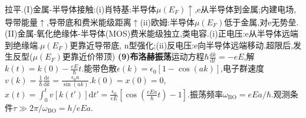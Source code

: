 \documentclass[UTF8,a4paper,10pt,twocolumn]{ctexart}
\begin{document}
拉平.(I)金属-半导体接触:(i)肖特基:半导体$\mu(E_{F})\uparrow$,e从半导体到金属;内建电场,导带能量$\uparrow$,导带底和费米能级距离$\uparrow$(ii)欧姆:半导体$\mu(E_{F})$低于金属,对e无势垒.(II)金属-氧化绝缘体-半导体(MOS)费米能级独立,类电容.(i)正电压:e从半导体远端到绝缘端.$\mu(E_{F})$更靠近导带底, n型强化;(ii)反电压:e向半导体远端移动.超限后,发生反型($\mu(E_{F})$更靠近价带顶)
   \textbf{(9)布洛赫振荡}运动方程$\hbar\frac{\mathrm{d}k}{\mathrm{d}t}=-eE$,解$k(t)=k(0)-\frac{eE}{\hbar}t$.能带色散$\epsilon(k)=\epsilon_{0}[1-\cos{(ak)}]$,电子群速度$v(k)=\frac{1}{\hbar}\frac{\mathrm{d}\epsilon}{\mathrm{d}k}=\frac{\epsilon_{0}a}{\sin{(ak)}}$.$k(0)=x(0)=0$,$x(t)=\int_{0}^{t}v[k(t')]\mathrm{d}t'=\frac{\epsilon_{0}}{eE}\left[\cos{(\frac{eEa}{\hbar}t)}-1\right]$.振荡频率$\omega_{\text{BO}}=eEa/\hbar$.观测条件$\tau\gg 2\pi/\omega_{\text{BO}}=h/eEa$.
   
\end{document}
